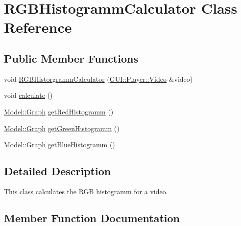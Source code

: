 \hypertarget{classUtility_1_1RGBHistogrammCalculator}{}\section{R\+G\+B\+Histogramm\+Calculator Class Reference}
\label{classUtility_1_1RGBHistogrammCalculator}
\subsection*{Public Member Functions}
\begin{DoxyCompactItemize}
\item 
void \hyperlink{classUtility_1_1RGBHistogrammCalculator_a0c01f44967ccf0d367f88a1bfd72c701}{R\+G\+B\+Historgramm\+Calculator} (\hyperlink{classGUI_1_1Player_1_1Video}{G\+U\+I\+::\+Player\+::\+Video} \&video)
\item 
void \hyperlink{classUtility_1_1RGBHistogrammCalculator_afe1d8348c24e6589bc7c0b3f689316a7}{calculate} ()
\item 
\hyperlink{classModel_1_1Graph}{Model\+::\+Graph} \hyperlink{classUtility_1_1RGBHistogrammCalculator_a11345d1b2b32275950a10525c1e0e9d1}{get\+Red\+Histogramm} ()
\item 
\hyperlink{classModel_1_1Graph}{Model\+::\+Graph} \hyperlink{classUtility_1_1RGBHistogrammCalculator_a84bbb0085709b08aef6f9f2a849dcf10}{get\+Green\+Histogramm} ()
\item 
\hyperlink{classModel_1_1Graph}{Model\+::\+Graph} \hyperlink{classUtility_1_1RGBHistogrammCalculator_a6bc6a7ac3d5da8080b9c5f146c0d4e8f}{get\+Blue\+Histogramm} ()
\end{DoxyCompactItemize}


\subsection{Detailed Description}
This class calculates the R\+G\+B histogramm for a video. 

\subsection{Member Function Documentation}
\hypertarget{classUtility_1_1RGBHistogrammCalculator_afe1d8348c24e6589bc7c0b3f689316a7}{}
